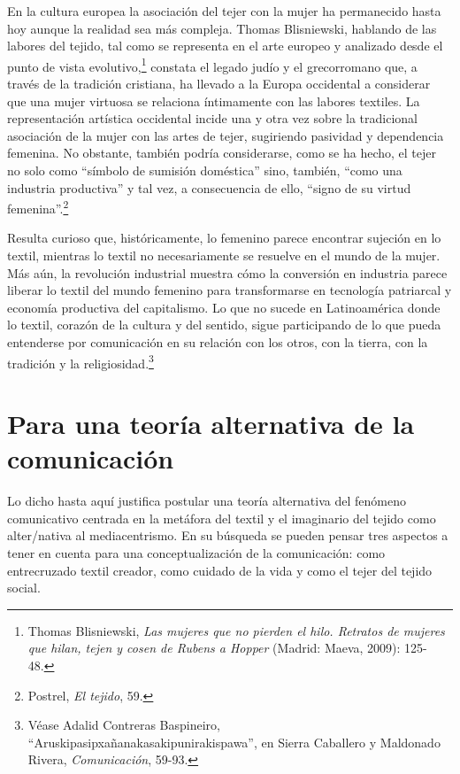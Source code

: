 \documentclass{tufte-handout}
\begin{document}
En la cultura europea la asociación del tejer con la mujer ha
permanecido hasta hoy aunque la realidad sea más compleja. Thomas
Blisniewski, hablando de las labores del tejido, tal como se representa
en el arte europeo y analizado desde el punto de vista
evolutivo,\footnote{Thomas Blisniewski, \emph{Las mujeres que no pierden
  el hilo. Retratos de mujeres que hilan, tejen y cosen de Rubens a
  Hopper} (Madrid: Maeva, 2009): 125-48.} constata el legado judío y el
grecorromano que, a través de la tradición cristiana, ha llevado a la
Europa occidental a considerar que una mujer virtuosa se relaciona
íntimamente con las labores textiles. La representación artística
occidental incide una y otra vez sobre la tradicional asociación de la
mujer con las artes de tejer, sugiriendo pasividad y dependencia
femenina. No obstante, también podría considerarse, como se ha hecho, el
tejer no solo como ``símbolo de sumisión doméstica'' sino, también,
``como una industria productiva'' y tal vez, a consecuencia de ello,
``signo de su virtud femenina''.\footnote{Postrel, \emph{El tejido}, 59.}

Resulta curioso que, históricamente, lo femenino parece encontrar
sujeción en lo textil, mientras lo textil no necesariamente se resuelve
en el mundo de la mujer. Más aún, la revolución industrial muestra cómo
la conversión en industria parece liberar lo textil del mundo femenino
para transformarse en tecnología patriarcal y economía productiva del
capitalismo. Lo que no sucede en Latinoamérica donde lo textil, corazón
de la cultura y del sentido, sigue participando de lo que pueda
entenderse por comunicación en su relación con los otros, con la tierra,
con la tradición y la religiosidad.\footnote{Véase Adalid Contreras
  Baspineiro, ``Aruskipasipxañanakasakipunirakispawa'', en Sierra
  Caballero y Maldonado Rivera, \emph{Comunicación}, 59-93.}

\hypertarget{para-una-teora-alternativa-de-la-comunicacin}{%
\section{Para una teoría alternativa de la
comunicación}\label{para-una-teora-alternativa-de-la-comunicacin}}

Lo dicho hasta aquí justifica postular una teoría alternativa del
fenómeno comunicativo centrada en la metáfora del textil y el imaginario
del tejido como alter/nativa al mediacentrismo. En su búsqueda se pueden
pensar tres aspectos a tener en cuenta para una conceptualización de la
comunicación: como entrecruzado textil creador, como cuidado de la vida
y como el tejer del tejido social.
\end{document}
